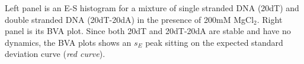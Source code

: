 \label{fig:bva_static}  Left panel is an E-S histogram for a mixture of single stranded DNA (20dT) and double stranded DNA (20dT-20dA) in the presence of 200mM MgCl$_2$. Right panel is its BVA plot. Since both 20dT and 20dT-20dA are stable and have no dynamics, the BVA plots shows an $s_E$ peak sitting on the expected standard deviation curve (\textit{red curve}).